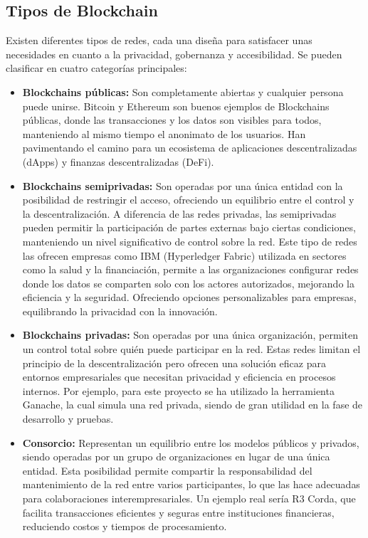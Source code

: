 \subsection{Tipos de Blockchain}

Existen diferentes tipos de redes, cada una diseña para satisfacer unas necesidades en cuanto a la privacidad, gobernanza y accesibilidad. 
Se pueden clasificar en cuatro categorías principales: ~\cite{introducciónBlockchain}

\begin{itemize}
\item \textbf{Blockchains públicas:} Son completamente abiertas y cualquier persona puede unirse. Bitcoin y Ethereum son buenos ejemplos de Blockchains públicas, donde las transacciones y los datos son visibles para todos, manteniendo al mismo tiempo el anonimato de los usuarios. Han pavimentando el camino para un ecosistema de aplicaciones descentralizadas (dApps) y finanzas descentralizadas (DeFi).

\item \textbf{Blockchains semiprivadas:} Son operadas por una única entidad con la posibilidad de restringir el acceso, ofreciendo un equilibrio entre el control y la descentralización. A diferencia de las redes privadas, las semiprivadas pueden permitir la participación de partes externas bajo ciertas condiciones, manteniendo un nivel significativo de control sobre la red.
Este tipo de redes las ofrecen empresas como IBM (Hyperledger Fabric) utilizada en sectores como la salud y la financiación, permite a las organizaciones configurar redes donde los datos se comparten solo con los actores autorizados, mejorando la eficiencia y la seguridad. Ofreciendo opciones personalizables para empresas, equilibrando la privacidad con la innovación. ~\cite{Hyperledger}

\item \textbf{Blockchains privadas:} Son operadas por una única organización, permiten un control total sobre quién puede participar en la red. Estas redes limitan el principio de la descentralización pero ofrecen una solución eficaz para entornos empresariales que necesitan privacidad y eficiencia en procesos internos.
Por ejemplo, para este proyecto se ha utilizado la herramienta Ganache, la cual simula una red privada, siendo de gran utilidad en la fase de desarrollo y pruebas.

\item \textbf{Consorcio:} Representan un equilibrio entre los modelos públicos y privados, siendo operadas por un grupo de organizaciones en lugar de una única entidad. Esta posibilidad permite compartir la responsabilidad del mantenimiento de la red entre varios participantes, lo que las hace adecuadas para colaboraciones interempresariales. 
Un ejemplo real sería R3 Corda, que facilita transacciones eficientes y seguras entre instituciones financieras, reduciendo costos y tiempos de procesamiento. ~\cite{R3Corda}

\end{itemize} 


